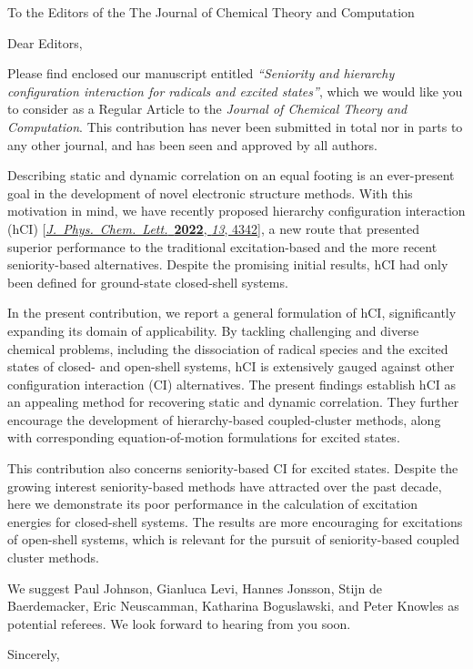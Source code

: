\documentclass[10pt]{letter}
\begin{document}
\begin{letter}%
{To the Editors of the The Journal of Chemical Theory and Computation}

\opening{Dear Editors,}

\justifying
Please find enclosed our manuscript entitled \textit{``Seniority and hierarchy configuration interaction for radicals and excited states''}, 
which we would like you to consider as a Regular Article to the \textit{Journal of Chemical Theory and Computation}.
This contribution has never been submitted in total nor in parts to any other journal, and has been seen and approved by all authors.

Describing static and dynamic correlation on an equal footing is an ever-present goal in the development of novel electronic structure methods.
With this motivation in mind, we have recently proposed hierarchy configuration interaction (hCI)
[\href{https://doi.org/10.1021/acs.jpclett.2c00730}{\textit{J.~Phys.~Chem.~Lett.}~\textbf{2022}, \textit{13}, 4342}],
a new route that presented superior performance to the traditional excitation-based and the more recent seniority-based alternatives.
Despite the promising initial results, hCI had only been defined for ground-state closed-shell systems.

In the present contribution, we report a general formulation of hCI, significantly expanding its domain of applicability.
By tackling challenging and diverse chemical problems, including the dissociation of radical species and the excited states of closed- and open-shell systems,
hCI is extensively gauged against other configuration interaction (CI) alternatives.
The present findings establish hCI as an appealing method for recovering static and dynamic correlation.
They further encourage the development of hierarchy-based coupled-cluster methods, along with corresponding equation-of-motion formulations for excited states.

This contribution also concerns seniority-based CI for excited states.
Despite the growing interest seniority-based methods have attracted over the past decade,
here we demonstrate its poor performance in the calculation of excitation energies for closed-shell systems.
The results are more encouraging for excitations of open-shell systems,
which is relevant for the pursuit of seniority-based coupled cluster methods.

We suggest Paul Johnson, Gianluca Levi, Hannes Jonsson, Stijn de Baerdemacker, Eric Neuscamman, Katharina Boguslawski, and Peter Knowles as potential referees.
We look forward to hearing from you soon.

\closing{Sincerely,}


\end{letter}
\end{document}
